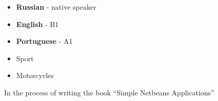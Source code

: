 

\begin{minipage}[t]{0.3\textwidth}
    \vspace{-\baselineskip} %

	\begin{itemize}[leftmargin=.2in]
	\setlength\itemsep{0em}
    	\item \textbf{Russian} - native speaker
    	\item \textbf{English} - B1
    	\item \textbf{Portuguese} - A1
    \end{itemize}

\end{minipage}
\hfill
\begin{minipage}[t]{0.3\textwidth}
    \vspace{-\baselineskip} %

	\begin{itemize}[leftmargin=.2in]
		\setlength\itemsep{0em}
	    \item Sport
	    \item Motorcycles
	\end{itemize}

\end{minipage}
\hfill
\begin{minipage}[t]{0.3\textwidth}
    \vspace{-\baselineskip} %


    In the process of writing the book \enquote{Simple Netbeans Applications}
\end{minipage}

\vspace{0.5cm}

